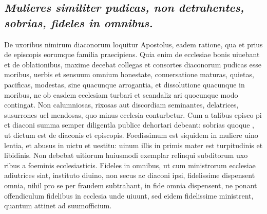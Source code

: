\documentclass{article}
\begin{document}
\begin{pages}
\subsection*{\textit{Mulieres similiter pudicas, non detrahentes, sobrias, fideles in omnibus. }}\pstart De uxoribus nimirum diaconorum loquitur Apostolus, eadem ratione, qua et prius de episcopis eorumque familia praecipiens. Quia enim de ecclesiae bonis uiuebant et de oblationibus, maxime decebat collegas et consortes diaconorum pudicas esse moribus, uerbis et sensuum omnium honestate, conuersatione maturas, quietas, pacificas, modestas, sine quacunque arrogantia, et dissolutione quacunque in moribus, ne ob easdem ecclesiam turbari et scandaliz ari quocunque  modo contingat. Non calumniosas, rixosas aut discordiam seminantes, delatrices, susurrones uel mendosas, quo minus ecclesia conturbetur. Cum a talibus episco pi et diaconi summa semper diligentla publice dehortari debeant: sobrias quoque , ut dictum est de diaconis et episcopis. Foedissimum est siquidem in muliere uino lentia, et abusus in uictu et uestitu: uinum illis in primis mater est turpitudinis et libidinis. Non debebat uitiorum huiusmodi exemplar relinqui subditorum uxo ribus a foeminis ecclesiasticis. Fideles in omnibus, ut cum ministrorum ecclesiae adiutrices sint, instituto diuino, non secus ac diaconi ipsi, fidelissime dispensent omnia, nihil pro se per fraudem subtrahant, in fide omnia dispensent, ne ponant offendiculum fidelibus in ecclesia unde uiuunt, sed eidem fidelissime ministrent, quantum attinet ad suumofficium.  \pend
{}
{}

\end{pages}
\end{document}
